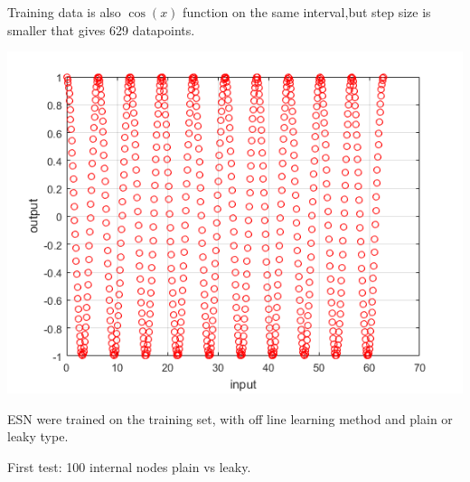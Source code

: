 \documentclass[a4paper, 12pt]{article}
\begin{document}
Training data is also $\cos(x)$ function on the same interval,but step size is smaller that gives 629 datapoints.

\begin{center}
\includegraphics[scale=0.6]{testdata.png}
\end{center}


ESN were trained on the training set, with off line learning method and plain or leaky type. 

First test: 100 internal nodes plain vs leaky.
\end{document}
